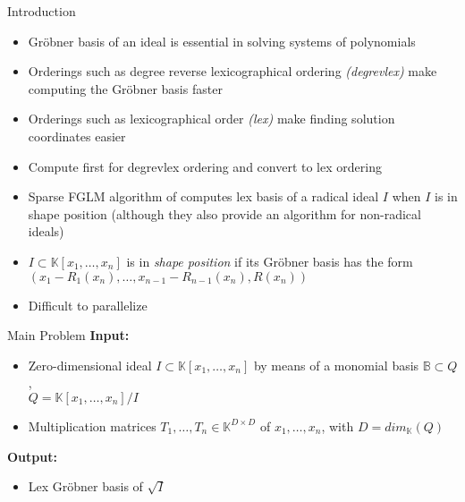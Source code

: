 \documentclass[final]{beamer}
\newlength{\onecolwid}
\begin{document}
\begin{frame}[t]
\begin{columns}[t]
\begin{column}{\onecolwid}
\begin{block}{Introduction}

\begin{itemize}
	\item Gr\"obner basis of an ideal is essential in solving systems of polynomials
	\item Orderings such as degree reverse lexicographical ordering \textit{(degrevlex)} make computing the Gr\"obner basis faster
	\item Orderings such as lexicographical order \textit{(lex)} make finding
	solution coordinates easier
	\item Compute first for degrevlex ordering and convert to lex ordering
	\item Sparse FGLM algorithm of \cite{FaMo17} computes lex basis of a radical
	ideal $I$ when $I$ is in shape position (although they also provide an algorithm
	for non-radical ideals)
	\item $I \subset \mathbb{K}[x_1,\dots,x_n]$ is in \textit{shape position} if
	its Gr\"obner basis has the form $(x_1-R_1(x_n), \dots, x_{n-1}-R_{n-1}(x_n), R(x_n))$
	\item Difficult to parallelize
\end{itemize}


\end{block}

\begin{alertblock}{Main Problem}
	\textbf{Input: }
	\begin{itemize}
	\item Zero-dimensional ideal $I \subset
	\mathbb{K}[x_1,\dots,x_n]$ by means of a monomial basis 
	$\mathbb{B} \subset Q$,\\ 
	$Q = \mathbb{K}[x_1,\dots,x_n]/I$
	\item Multiplication matrices  $T_1,\dots, T_n \in 
	\mathbb{K}^{D \times D}$ of $x_1,\dots,x_n$, with
	$D = dim_{\mathbb{K}}(Q)$
	\end{itemize}
	\textbf{Output:}
	\begin{itemize}
		\item Lex Gr\"obner basis of $\sqrt{I}$
	\end{itemize}
\end{alertblock}



\end{column} %


\end{columns}
\end{frame}
\end{document}
